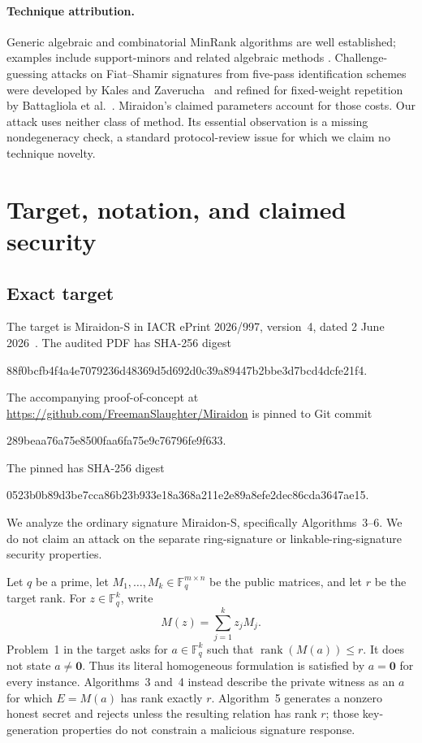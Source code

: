 \documentclass[10pt,a4paper]{article}
\newcommand{\F}{\mathbb{F}}
\newcommand{\rank}{\operatorname{rank}}
\newcommand{\vectzero}{\boldsymbol{0}}
\begin{document}
\paragraph{Technique attribution.}
Generic algebraic and combinatorial MinRank algorithms are well established;
examples include support-minors and related algebraic methods
\cite{bardet2020,bardet2023}.  Challenge-guessing attacks on Fiat--Shamir
signatures from five-pass identification schemes were developed by Kales and
Zaverucha~\cite{kales2020} and refined for fixed-weight repetition by
Battagliola et al.~\cite{battagliola2025revision,battagliola2025fixed}.
Miraidon's claimed parameters account for those costs.  Our attack uses
neither class of method.  Its essential observation is a missing
nondegeneracy check, a standard protocol-review issue for which we claim no
technique novelty.

\section{Target, notation, and claimed security}

\subsection{Exact target}

The target is Miraidon-S in IACR ePrint 2026/997, version~4, dated 2 June
2026~\cite{miraidon}.  The audited PDF has SHA-256 digest
\begin{center}
\small\ttfamily
88f0bcfb4f4a4e7079236d48369d5d692d0c39a89447b2bbe3d7bcd4dcfe21f4.
\end{center}
The accompanying proof-of-concept at
\url{https://github.com/FreemanSlaughter/Miraidon} is pinned to Git commit
\begin{center}
\small\ttfamily 289beaa76a75e8500faa6fa75e9c76796fe9f633.
\end{center}
The pinned  has SHA-256 digest
\begin{center}
\small\ttfamily 0523b0b89d3be7cca86b23b933e18a368a211e2e89a8efe2dec86cda3647ae15.
\end{center}
We analyze the ordinary
signature Miraidon-S, specifically Algorithms~3--6.  We do not claim an
attack on the separate ring-signature or linkable-ring-signature security
properties.

Let $q$ be a prime, let $M_1,\ldots,M_k\in\F_q^{m\times n}$ be the public
matrices, and let $r$ be the target rank.  For $z\in\F_q^k$, write
\[
  M(z)=\sum_{j=1}^{k} z_jM_j.
\]
Problem~1 in the target asks for $a\in\F_q^k$ such that
$\rank(M(a))\le r$.  It does not state $a\ne\vectzero$.  Thus its literal
homogeneous formulation is satisfied by $a=\vectzero$ for every instance.
Algorithms~3 and~4 instead describe the private witness as an $a$ for which
$E=M(a)$ has rank exactly $r$.  Algorithm~5 generates a nonzero honest secret
and rejects unless the resulting relation has rank $r$; those key-generation
properties do not constrain a malicious signature response.
\end{document}
